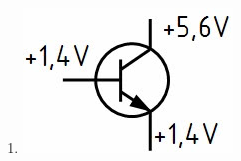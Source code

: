 \documentclass[8pt]{article}
\begin{document}
\begin{enumerate}
\begin{enumerate}[nolistsep,label=\Alph*]
{\begin{enumerate}[nolistsep,label=\Alph*]
\begin{enumerate}[nolistsep,label=\Alph*]
\begin{center}
	\end{center}
\item
	\begin{center}
		\begin{minipage}{\linewidth}
			\centering
			\includegraphics[scale=1.0]{pics/tc614_d.jpg}
		\end{minipage}
	\end{center}
\end{enumerate}


\end{enumerate}}
\end{enumerate}
\end{enumerate}
\end{document}
